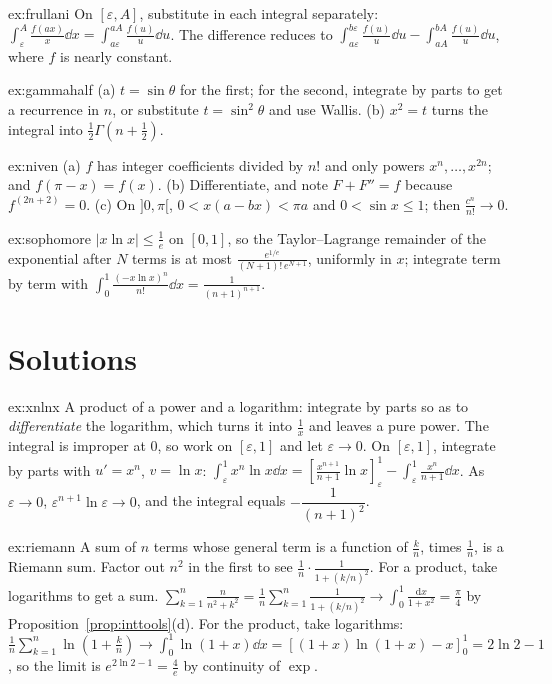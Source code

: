\begin{hint}{ex:frullani}
On $[\varepsilon,A]$, substitute in each integral separately: $\int_\varepsilon^A\frac{f(ax)}x\dd x=\int_{a\varepsilon}^{aA}\frac{f(u)}u\dd u$. The difference reduces to $\int_{a\varepsilon}^{b\varepsilon}\frac{f(u)}u\dd u-\int_{aA}^{bA}\frac{f(u)}u\dd u$, where $f$ is nearly constant.
\end{hint}
\begin{hint}{ex:gammahalf}
(a) $t=\sin\theta$ for the first; for the second, integrate by parts to get a recurrence in $n$, or substitute $t=\sin^2\theta$ and use Wallis. (b) $x^2=t$ turns the integral into $\frac12\Gamma\left(n+\frac12\right)$.
\end{hint}
\begin{hint}{ex:niven}
(a) $f$ has integer coefficients divided by $n!$ and only powers $x^n,\dots,x^{2n}$; and $f(\pi-x)=f(x)$. (b) Differentiate, and note $F+F''=f$ because $f^{(2n+2)}=0$. (c) On $]0,\pi[$, $0<x(a-bx)<\pi a$ and $0<\sin x\le1$; then $\frac{c^n}{n!}\to0$.
\end{hint}
\begin{hint}{ex:sophomore}
$|x\ln x|\le\frac1e$ on $[0,1]$, so the Taylor--Lagrange remainder of the exponential after $N$ terms is at most $\frac{e^{1/e}}{(N+1)!\,e^{N+1}}$, uniformly in $x$; integrate term by term with $\int_0^1\frac{(-x\ln x)^n}{n!}\dd x=\frac1{(n+1)^{n+1}}$.
\end{hint}

\section{Solutions}
\begin{solution}{ex:xnlnx}
\idea A product of a power and a logarithm: integrate by parts so as to \emph{differentiate} the logarithm, which turns it into $\frac1x$ and leaves a pure power. The integral is improper at $0$, so work on $[\varepsilon,1]$ and let $\varepsilon\to0$.
\writeup On $[\varepsilon,1]$, integrate by parts with $u'=x^n$, $v=\ln x$:
$\int_\varepsilon^1x^n\ln x\dd x=\left[\frac{x^{n+1}}{n+1}\ln x\right]_\varepsilon^1-\int_\varepsilon^1\frac{x^n}{n+1}\dd x$.
As $\varepsilon\to0$, $\varepsilon^{n+1}\ln\varepsilon\to0$, and the integral equals $-\dfrac1{(n+1)^2}$.
\end{solution}

\begin{solution}{ex:riemann}
\idea A sum of $n$ terms whose general term is a function of $\frac kn$, times $\frac1n$, is a Riemann sum. Factor out $n^2$ in the first to see $\frac1n\cdot\frac1{1+(k/n)^2}$. For a product, take logarithms to get a sum.
\writeup $\sum_{k=1}^n\frac n{n^2+k^2}=\frac1n\sum_{k=1}^n\frac1{1+(k/n)^2}\to\int_0^1\frac{\mathrm dx}{1+x^2}=\frac\pi4$ by Proposition~\ref{prop:inttools}(d).
For the product, take logarithms: $\frac1n\sum_{k=1}^n\ln\left(1+\frac kn\right)\to\int_0^1\ln(1+x)\dd x=\left[(1+x)\ln(1+x)-x\right]_0^1=2\ln2-1$, so the limit is $e^{2\ln2-1}=\frac4e$ by continuity of $\exp$.
\end{solution}

